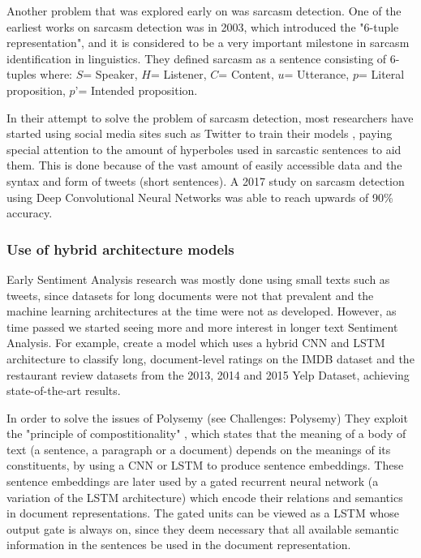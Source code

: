 \documentclass[preprint,review,12pt]{elsarticle}
\begin{document}
Another problem that was explored early on was sarcasm detection. One of the earliest works on sarcasm detection was \citet{stacey} in 2003, which introduced the "6-tuple representation", and it is considered to be a very important milestone in sarcasm identification in linguistics. They defined sarcasm as a sentence consisting of 6-tuples where: $S$= Speaker, $H$= Listener, $C$= Content, $u$= Utterance, $p$= Literal proposition, $p’$= Intended proposition.

In their attempt to solve the problem of sarcasm detection, most researchers have started using social media sites such as Twitter to train their models \cite{dmitry}, paying special attention to the amount of hyperboles used in sarcastic sentences to aid them. This is done because of the vast amount of easily accessible data and the syntax and form of tweets (short sentences). A 2017 study on sarcasm detection \cite{shelly} using Deep Convolutional Neural Networks was able to reach upwards of 90\% accuracy.


\subsubsection{Use of hybrid architecture models} 
 
Early Sentiment Analysis research was mostly done using small texts such as tweets, since datasets for long documents were not that prevalent and the machine learning architectures at the time were not as developed. However, as time passed we started seeing more and more interest in longer text Sentiment Analysis. For example, \citet{tang} create a model which uses a hybrid CNN and LSTM\cite{LSTM} architecture to classify long, document-level ratings on the IMDB dataset \cite{diao} and the restaurant review datasets from the 2013, 2014 and 2015 Yelp Dataset, achieving state-of-the-art results.  

In order to solve the issues of Polysemy (see Challenges: Polysemy) They exploit the "principle of compostitionality" \cite{francis}, which states that the meaning of a body of text (a sentence, a paragraph or a document) depends on the meanings of its constituents, by using a CNN or LSTM to produce sentence embeddings. These sentence embeddings are later used by a gated recurrent neural network (a variation of the LSTM architecture) which encode their relations and semantics in document representations. The gated units can be viewed as a LSTM whose output gate is always on, since they deem necessary that all available semantic information in the sentences be used in the document representation.
\end{document}
